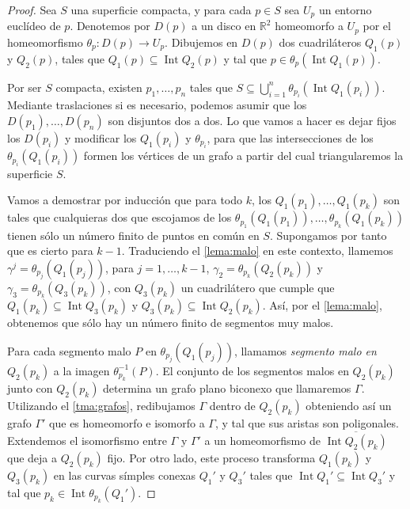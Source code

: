 \documentclass[10pt]{report}
\newcommand{\R}{\mathbb{R}}
\DeclareMathOperator{\interior}{Int} %
\theoremstyle{definition}
\begin{document}
\begin{proof}
Sea $S$ una superficie compacta, y para cada $p\in S$ sea $U_p$ un entorno euclídeo de $p$. Denotemos por $D(p)$ a un disco en $\R^2$ homeomorfo a $U_p$ por el homeomorfismo $\theta_p :D(p)\to U_p$. Dibujemos en $D(p)$ dos cuadriláteros $Q_1(p)$ y $Q_2(p)$, tales que $Q_1(p) \subseteq \interior{Q_2(p)} $ y tal que $p\in \theta_p (\interior{Q_1(p)} )$.

Por ser $S$ compacta, existen $p_1, \dots ,p_n$ tales que $S\subseteq \bigcup_{i=1}^n \theta_{p_i} ( \interior{Q_1(p_i)} )$. Mediante traslaciones si es necesario, podemos asumir que los $D(p_1), \dots , D(p_n)$ son disjuntos dos a dos. Lo que vamos a hacer es dejar fijos los $D(p_i)$ y modificar los $Q_1(p_i)$ y $\theta_{p_i}$, para que las intersecciones de los $\theta_{p_i} (Q_1(p_i))$ formen los vértices de un grafo a partir del cual triangularemos la superficie $S$.

Vamos a demostrar por inducción que para todo $k$, los $Q_1(p_1), \dots ,Q_1(p_k)$ son tales que cualquieras dos que escojamos de los $\theta_{p_1} (Q_1(p_1)), \dots ,\theta_{p_k} (Q_1 (p_k))$ tienen sólo un número finito de puntos en común en $S$. Supongamos por tanto que es cierto para $k-1$. Traduciendo el \autoref{lema:malo} en este contexto, llamemos $\gamma^j = \theta_{p_j} (Q_1 (p_j))$, para $j=1, \dots ,k-1$, $\gamma_2 = \theta_{p_k} (Q_2 (p_k) ) $ y $\gamma_3 = \theta_{p_k} (Q_3 (p_k))$, con $Q_3 (p_k)$ un cuadrilátero que cumple que $Q_1 (p_k) \subseteq \interior{Q_3 (p_k) }$ y $Q_3 (p_k) \subseteq \interior{ Q_2 (p_k)}$. Así, por el \autoref{lema:malo}, obtenemos que sólo hay un número finito de segmentos muy malos.

Para cada segmento malo $P$ en $\theta_{p_j} (Q_1(p_j))$, llamamos \textit{segmento malo en} $Q_2(p_k)$ a la imagen $\theta^{-1}_{p_k} (P)$. El conjunto de los segmentos malos en $Q_2 (p_k)$ junto con $Q_2 (p_k)$ determina un grafo plano biconexo que llamaremos $\Gamma$. Utilizando el \autoref{tma:grafos}, redibujamos $\Gamma$ dentro de $Q_2(p_k)$ obteniendo así un grafo $\Gamma'$ que es homeomorfo e isomorfo a $\Gamma$, y tal que sus aristas son poligonales. Extendemos el isomorfismo entre $\Gamma$ y $\Gamma'$ a un homeomorfismo de $\overline{\interior{Q_2 (p_k)}}$ que deja a $Q_2 (p_k)$ fijo. Por otro lado, este proceso transforma $Q_1 (p_k)$ y $Q_3(p_k)$ en las curvas símples conexas $Q_1'$ y $Q_3'$ tales que $\interior{Q_1'} \subseteq \interior{Q_3'}$ y tal que $p_k\in \interior{\theta_{p_k} (Q_1')}$. 


\end{proof}
\end{document}
